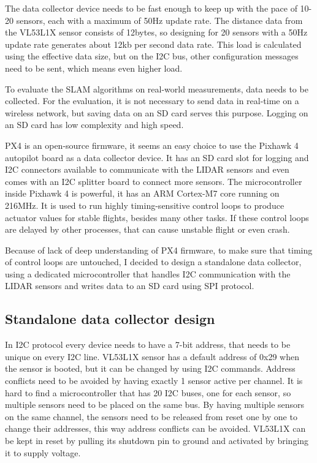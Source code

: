 The data collector device needs to be fast enough to keep up with the pace of 10-20 sensors,
each with a maximum of 50Hz update rate. The distance data from the VL53L1X sensor consists of 12bytes,
so designing for 20 sensors with a 50Hz update rate generates about 12kb per second data rate. This
load is calculated using the effective data size, but on the I2C bus, other configuration messages
need to be sent, which means even higher load.

To evaluate the SLAM algorithms on real-world measurements, data needs to be collected.
For the evaluation, it is not necessary to send data in real-time on a wireless network, but saving
data on an SD card serves this purpose. Logging on an SD card has low complexity and high speed.

PX4 is an open-source firmware, it seems an easy choice to use the Pixhawk 4 autopilot board
as a data collector device. It has an SD card slot for logging and I2C connectors available to
communicate with the LIDAR sensors and even comes with an I2C splitter board to connect more sensors.
The microcontroller inside Pixhawk 4 is powerful, it has an ARM Cortex-M7 core running on 216MHz.
It is used to run highly timing-sensitive control loops to produce actuator values for stable flights,
besides many other tasks. If these control loops are delayed by other processes, that can
cause unstable flight or even crash.

Because of lack of deep understanding of PX4 firmware, to make sure that timing of control loops
are untouched, I decided to design a standalone data collector, using a dedicated microcontroller that
handles I2C communication with the LIDAR sensors and writes data to an SD card using SPI protocol.

\subsection{Standalone data collector design}
In I2C protocol every device needs to have a 7-bit address, that needs to be unique on every
I2C line. VL53L1X sensor has a default address of 0x29 when the sensor is booted, but it can be changed
by using I2C commands. Address conflicts need to be avoided by having exactly 1 sensor active per channel.
It is hard to find a microcontroller that has 20 I2C buses, one for each sensor, so multiple sensors
need to be placed on the same bus. By having multiple sensors on the same channel, the sensors need to
be released from reset one by one to change their addresses, this way address conflicts can be avoided.
VL53L1X can be kept in reset by pulling its shutdown pin to ground and activated by bringing it to
supply voltage.


